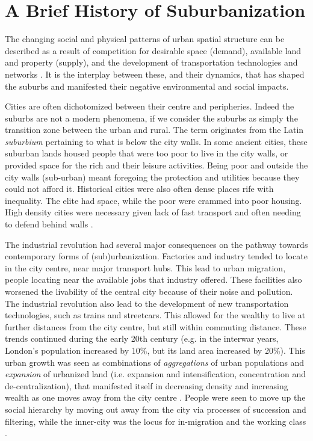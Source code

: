 

\section{A Brief History of Suburbanization}

The changing social and physical patterns of urban spatial structure can be described as a result of competition for desirable space (demand), available land and property (supply), and the development of transportation technologies and networks \cite{alonso_location_1964,anas_urban_1998}. It is the interplay between these, and their dynamics, that has shaped the suburbs and manifested their negative environmental and social impacts.

Cities are often dichotomized between their centre and peripheries. Indeed the suburbs are not a modern phenomena, if we consider the suburbs as simply the transition zone between the urban and rural. The term originates from the Latin \textit{suburbium} pertaining to what is below the city walls. In some ancient cities, these suburban lands housed people that were too poor to live in the city walls, or provided space for the rich and their leisure activities. Being poor and outside the city walls (sub-urban) meant foregoing the protection and utilities because they could not afford it. Historical cities were also often dense places rife with inequality. The elite had space, while the poor were crammed into poor housing. High density cities were necessary given lack of fast transport and often needing to defend behind walls \cite{bruegmann_sprawl:_2008}.

The industrial revolution had several major consequences on the pathway towards contemporary forms of (sub)urbanization. Factories and industry tended to locate in the city centre, near major transport hubs. This lead to urban migration, people locating near the available jobs that industry offered. These facilities also worsened the livability of the central city because of their noise and pollution. The industrial revolution also lead to the development of new transportation technologies, such as trains and streetcars. This allowed for the wealthy to live at further distances from the city centre, but still within commuting distance. These trends continued during the early 20th century (e.g. in the interwar years, London's population increased by 10\%, but its land area increased by 20\%). This urban growth was seen as combinations of \textit{aggregations} of urban populations and \textit{expansion} of urbanized land (i.e. expansion and intensification, concentration and de-centralization), that manifested itself in decreasing density and increasing wealth as one moves away from the city centre \cite{burgess_growth_1925}. People were seen to move up the social hierarchy by moving out away from the city via processes of succession and filtering, while the inner-city was the locus for in-migration and the working class \cite{burgess_growth_1925}.

